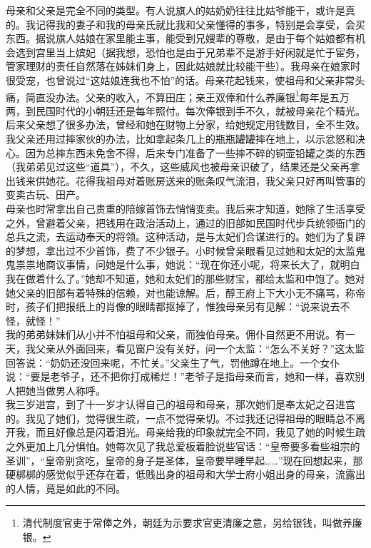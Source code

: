 母亲和父亲是完全不同的类型。有人说旗人的姑奶奶往往比姑爷能干，或许是真的。我记得我的妻子和我的母亲氏就比我和父亲懂得的事多，特别是会享受，会买东西。据说旗人姑娘在家里能主事，能受到兄嫂辈的尊敬，是由于每个姑娘都有机会选到宫里当上嫔妃（据我想，恐怕也是由于兄弟辈不是游手好闲就是忙于宦务，管家理财的责任自然落在姊妹们身上，因此姑娘就比较能干些）。我母亲在娘家时很受宠，也曾说过“这姑娘连我也不怕”的话。母亲花起钱来，使祖母和父亲非常头痛，简直没办法。父亲的收入，不算田庄；亲王双俸和什么养廉银\footnote{清代制度官吏于常俸之外，朝廷为示要求官吏清廉之意，另给银钱，叫做养廉银。}每年是五万两，到民国时代的小朝廷还是每年照付。每次俸银到手不久，就被母亲花个精光。后来父亲想了很多办法，曾经和她在财物上分家，给她规定用钱数目，全不生效。我父亲还用过摔家伙的办法，比如拿起条几上的瓶瓶罐罐摔在地上，以示忿怒和决心。因为总摔东西未免舍不得，后来专门准备了一些摔不碎的铜壶铅罐之类的东西（我弟弟见过这些“道具”），不久，这些威风也被母亲识破了，结果还是父亲再拿出钱来供她花。花得我祖母对着账房送来的账条叹气流泪，我父亲只好再叫管事的变卖古玩、田产。\\

母亲也时常拿出自己贵重的陪嫁首饰去悄悄变卖。我后来才知道，她除了生活享受之外，曾避着父亲，把钱用在政治活动上，通过的旧部如民国时代步兵统领衙门的总兵之流，去运动奉天的将领。这种活动，是与太妃们合谋进行的。她们为了复辟的梦想，拿出过不少首饰，费了不少银子。小时候曾亲眼看见过她和太妃的太监鬼鬼祟祟地商议事情，问她是什么事，她说：“现在你还小呢，将来长大了，就明白我在做着什么了。”她却不知道，她和太妃们的那些财宝，都给太监和中饱了。她对她父亲的旧部有着特殊的信赖，对也能谅解。后，醇王府上下大小无不痛骂，称帝时，孩子们把报纸上的肖像的眼睛都抠掉了，惟独母亲另有见解：“说来说去不怪，就怪！”\\

我的弟弟妹妹们从小并不怕祖母和父亲，而独伯母亲。佣仆自然更不用说。有一天，我父亲从外面回来，看见窗户没有关好，问一个太监：“怎么不关好？”这太监回答说：“奶奶还没回来呢，不忙关。”父亲生了气，罚他蹲在地上。一个女仆说：“要是老爷子，还不把你打成稀烂！”老爷子是指母亲而言，她和一样，喜欢别人把她当做男人称呼。\\

我三岁进宫，到了十一岁才认得自己的祖母和母亲，那次她们是奉太妃之召进宫的。我见了她们，觉得很生疏，一点不觉得亲切。不过我还记得祖母的眼睛总不离开我，而且好像总是闪着泪光。母亲给我的印象就完全不同，我见了她的时候生疏之外更加上几分惧怕。她每次见了我总爱板着脸说些官话：“皇帝要多看些祖宗的圣训”，“皇帝别贪吃，皇帝的身子是圣体，皇帝要早睡早起……”现在回想起来，那硬梆梆的感觉似乎还存在着，低贱出身的祖母和大学士府小姐出身的母亲，流露出的人情，竟是如此的不同。

